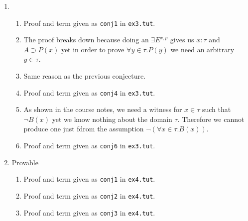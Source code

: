 \documentclass{article}
\begin{document}
\begin{enumerate}[label=\textbf{Exercise \arabic*}]
\item

\begin{enumerate}[label=\arabic*.,leftmargin=1em]
\item Proof and term given as \texttt{conj1} in \texttt{ex3.tut}.
\item The proof breaks down because doing an $\exists E^{x,p}$ gives us $x:\tau$ and $A\supset P(x)$ yet in order to prove $\forall y\in\tau.P(y)$ we need an arbitrary $y\in\tau$.
\item Same reason as the previous conjecture.
\item Proof and term given as \texttt{conj4} in \texttt{ex3.tut}.
\item As shown in the course notes, we need a witness for $x\in\tau$ such that $\neg B(x)$ yet we know nothing about the domain $\tau$. Therefore we cannot produce one just fdrom the assumption $\neg(\forall x\in\tau.B(x))$.
\item Proof and term given as \texttt{conj6} in \texttt{ex3.tut}.
\end{enumerate}

\item Provable
\begin{enumerate}[label=\arabic*.,leftmargin=1em]
\item Proof and term given as \texttt{conj1} in \texttt{ex4.tut}.
\item Proof and term given as \texttt{conj2} in \texttt{ex4.tut}.
\item Proof and term given as \texttt{conj3} in \texttt{ex4.tut}.
\end{enumerate}

\end{enumerate}
\end{document}
